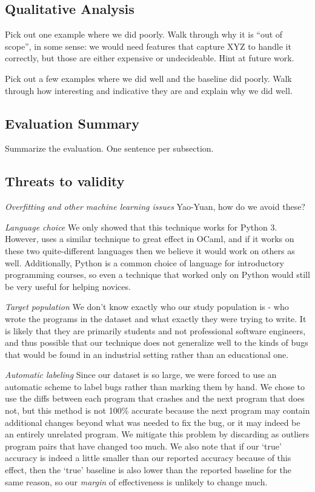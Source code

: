 \documentclass[conference]{IEEEtran}
\begin{document}
\subsection{Qualitative Analysis}

Pick out one example where we did poorly. Walk through why it is ``out of
scope'', in some sense: we would need features that capture XYZ to handle
it correctly, but those are either expensive or undecideable. Hint at
future work.

Pick out a few examples where we did well and the baseline did poorly. Walk
through how interesting and indicative they are and explain why we did well.

\subsection{Evaluation Summary}

Summarize the evaluation. One sentence per subsection.

\subsection{Threats to validity}

\emph{Overfitting and other machine learning issues} Yao-Yuan, how do we avoid
these?

\emph{Language choice} We only showed that this technique works for Python 3.
However, \cite{learning-to-blame} uses a similar technique to great effect in
OCaml, and if it works on these two quite-different languages then we believe
it would work on others as well. Additionally, Python is a common choice of
language for introductory programming courses, so even a technique that worked
only on Python would still be very useful for helping novices.

\emph{Target population} We don't know exactly who our study population is -
who wrote the programs in the dataset and what exactly they were trying to write.
It is likely that they are primarily students and not professional software engineers,
and thus possible that our technique does not generalize well to the kinds of
bugs that would be found in an industrial setting rather than an educational one.

\emph{Automatic labeling} Since our dataset is so large, we were forced to use an automatic
scheme to label bugs rather than marking them by hand. We chose to use the diffs
between each program that crashes and the next program that does not, but this method
is not 100\% accurate because the next program may contain additional changes
beyond what was needed to fix the bug, or it may indeed be an entirely unrelated
program. We mitigate this problem by discarding as outliers program pairs that have
changed too much. We also note that if our `true' accuracy is indeed a little
smaller than our reported accuracy because of this effect, then the `true' baseline
is also lower than the reported baseline for the same reason, so our
\emph{margin} of effectiveness is unlikely to change much.
\end{document}

